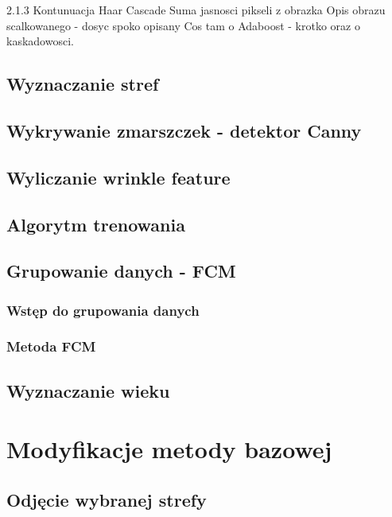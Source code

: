 2.1.3 Kontunuacja Haar Cascade %
Suma jasnosci pikseli z obrazka
Opis obrazu scalkowanego - dosyc spoko opisany
Cos tam o Adaboost - krotko oraz o kaskadowosci.

\section{Wyznaczanie stref}\label{sec:wyznaczanieStref}

\section{Wykrywanie zmarszczek - detektor Canny}\label{sec:wykrywanieZmarszczek}

\section{Wyliczanie wrinkle feature}\label{sec:wyliczanieWrinkleFeature}

\section{Algorytm trenowania}\label{sec:algorytmTrenowania}

\section{Grupowanie danych - FCM}\label{sec:grupowanieDanych}

\subsection{Wstęp do grupowania danych}
\subsection{Metoda FCM}

\section{Wyznaczanie wieku}\label{sec:wyznaczanieWieku}



\chapter{Modyfikacje metody bazowej}

\section{Odjęcie wybranej strefy}

